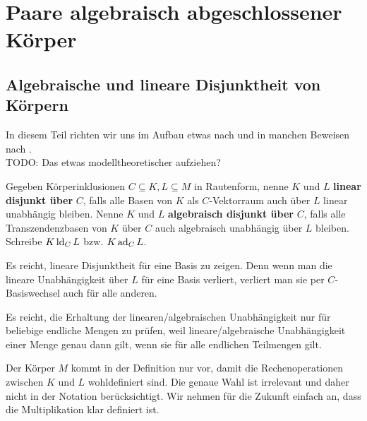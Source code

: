 	\chapter{Paare algebraisch abgeschlossener Körper}
	\section{Algebraische und lineare Disjunktheit von Körpern}
	In diesem Teil richten wir uns im Aufbau etwas nach \cite{Delon} und in manchen Beweisen nach \cite{SergeLang}.\\
	TODO: Das etwas modelltheoretischer aufziehen?
	
    \begin{definition}
    	Gegeben Körperinklusionen $C\subseteq K,L\subseteq M$ in Rautenform, nenne $K$ und $L$ \textbf{linear disjunkt über } $C$, falls alle Basen von $K$ als $C$-Vektorraum auch über $L$ linear unabhängig bleiben. Nenne $K$ und $L$ \textbf{algebraisch disjunkt über} $C$, falls alle Transzendenzbasen von $K$ über $C$ auch algebraisch unabhängig über $L$ bleiben. Schreibe $K\operatorname{ld}_CL$ bzw. $K\operatorname{ad}_CL$.
    \end{definition}
    
    \begin{remark}
    	Es reicht, lineare Disjunktheit für eine Basis zu zeigen. Denn wenn man die lineare Unabhängigkeit über $L$ für eine Basis verliert, verliert man sie per $C$-Basiswechsel auch für alle anderen.
    \end{remark}
    \begin{remark}
    	Es reicht, die Erhaltung der linearen/algebraischen Unabhängigkeit nur für beliebige endliche Mengen zu prüfen, weil lineare/algebraische Unabhängigkeit einer Menge genau dann gilt, wenn sie für alle endlichen Teilmengen gilt.
    \end{remark}
    \begin{remark}
    	Der Körper $M$ kommt in der Definition nur vor, damit die Rechenoperationen zwischen $K$ und $L$ wohldefiniert sind. Die genaue Wahl ist irrelevant und daher nicht in der Notation berücksichtigt. Wir nehmen für die Zukunft einfach an, dass die Multiplikation klar definiert ist.
    \end{remark}
    
